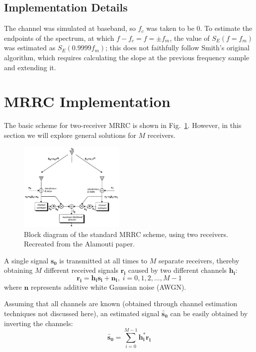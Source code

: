\documentclass[journal]{IEEEtran}
\begin{document}
\subsection{Implementation Details}
The channel was simulated at baseband, so $f_c$ was taken to be 0. To estimate the endpoints of the spectrum, at which $f - f_c = f = \pm f_m$, the value of $S_E(f = f_m)$ was estimated as $S_E(0.9999f_m)$; this does not faithfully follow Smith's original algorithm, which requires calculating the slope at the previous frequency sample and extending it.

\section{MRRC Implementation} \label{sec:MRRC}
The basic scheme for two-receiver MRRC is shown in Fig.~\ref{fig:MRRC_block}. However, in this section we will explore general solutions for $M$ receivers.

\begin{figure}
    \centering
    \includegraphics[width = 0.45\textwidth]{MRRC-2}
    \caption{Block diagram of the standard MRRC scheme, using two receivers. Recreated from the Alamouti paper.}
    \label{fig:MRRC_block}
\end{figure}

A single signal $\pmb{s_0}$ is transmitted at all times to $M$ separate receivers, thereby obtaining $M$ different received signals $\pmb{r_i}$ caused by two different channels $\pmb{h_i}$:
\begin{equation}
\pmb{r_i} = \pmb{h_i s_i} + \pmb{n_i}, \; i = 0,1,2,\ldots,M-1
\end{equation}
where $\pmb{n}$ represents additive white Gaussian noise (AWGN).

Assuming that all channels are known (obtained through channel estimation techniques not discussed here), an estimated signal $\pmb{\tilde{s_0}}$ can be easily obtained by inverting the channels:
\begin{equation}
\pmb{\tilde{s_0}} = \sum_{i=0}^{M-1} \pmb{h_i^* r_i}
\end{equation}
\end{document}
